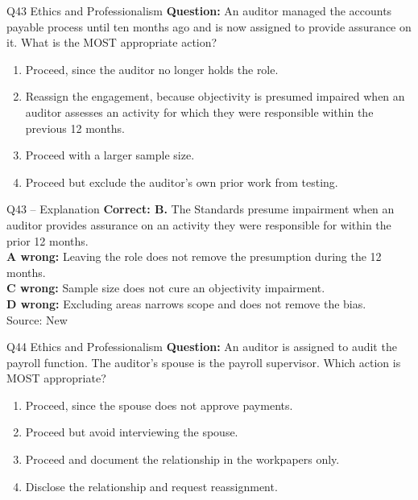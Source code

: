 \documentclass[aspectratio=169,10pt]{beamer}
\begin{document}
\begin{frame}[t]{Q43 \hfill {\scriptsize Ethics and Professionalism}}
	\small
	\textbf{Question:} An auditor managed the accounts payable process until ten months ago and is now assigned to provide assurance on it. What is the MOST appropriate action?
	\begin{enumerate}[label=\Alph*.,itemsep=1pt,topsep=3pt]
			\item Proceed, since the auditor no longer holds the role.
			\item Reassign the engagement, because objectivity is presumed impaired when an auditor assesses an activity for which they were responsible within the previous 12 months.
			\item Proceed with a larger sample size.
			\item Proceed but exclude the auditor's own prior work from testing.
	\end{enumerate}
\end{frame}

\begin{frame}[t]{Q43 -- Explanation}
	\footnotesize
	\textbf{Correct: B.} The Standards presume impairment when an auditor provides assurance on an activity they were responsible for within the prior 12 months. \\[5pt]
\textbf{A wrong:} Leaving the role does not remove the presumption during the 12 months. \\[3pt]
\textbf{C wrong:} Sample size does not cure an objectivity impairment. \\[3pt]
\textbf{D wrong:} Excluding areas narrows scope and does not remove the bias. \\[3pt]
	\vfill {\tiny Source: New}
\end{frame}

\begin{frame}[t]{Q44 \hfill {\scriptsize Ethics and Professionalism}}
	\small
	\textbf{Question:} An auditor is assigned to audit the payroll function. The auditor's spouse is the payroll supervisor. Which action is MOST appropriate?
	\begin{enumerate}[label=\Alph*.,itemsep=1pt,topsep=3pt]
			\item Proceed, since the spouse does not approve payments.
			\item Proceed but avoid interviewing the spouse.
			\item Proceed and document the relationship in the workpapers only.
			\item Disclose the relationship and request reassignment.
	\end{enumerate}
\end{frame}
\end{document}
